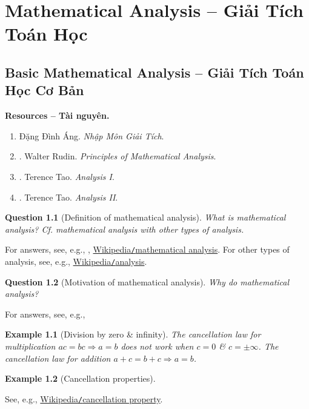 \documentclass[oneside]{book}
\newtheorem{example}{Example}
\newtheorem{question}{Question}
\begin{document}
\part{Mathematical Analysis -- Giải Tích Toán Học}

\chapter{Basic Mathematical Analysis -- Giải Tích Toán Học Cơ Bản}
\minitoc
\textbf{\textsf{Resources -- Tài nguyên.}}
\begin{enumerate}
	\item {\sc Đặng Đình Áng}. {\it Nhập Môn Giải Tích}.
	\item \cite{Rudin1976}. {\sc Walter Rudin}. {\it Principles of Mathematical Analysis}.
	
	\item \cite{Tao_analysis_1}. {\sc Terence Tao}. {\it Analysis I}.
	
	\item \cite{Tao_analysis_2}. {\sc Terence Tao}. {\it Analysis II}.
\end{enumerate}

\begin{question}[Definition of mathematical analysis]
	What is mathematical analysis? Cf. mathematical analysis with other types of analysis.
\end{question}
For answers, see, e.g., \cite[Chap. 1, Sect. 1.1: {\it What Is Analysis?}, pp. 1--2]{Tao_analysis_1}, \href{https://en.wikipedia.org/wiki/Mathematical_analysis}{Wikipedia{\tt/}mathematical analysis}. For other types of analysis, see, e.g., \href{https://en.wikipedia.org/wiki/Analysis}{Wikipedia{\tt/}analysis}.

\begin{question}[Motivation of mathematical analysis]
	Why do mathematical analysis?
\end{question}
For answers, see, e.g., \cite[Chap. 1, Sect. 1.2: {\it Why Do Analysis?}, pp. 2--10]{Tao_analysis_1}

\begin{example}[Division by zero \& infinity]
	The cancellation law for multiplication $ac = bc\Rightarrow a = b$ does not work when $c = 0$ \& $c = \pm\infty$. The cancellation law for addition $a + c = b + c\Rightarrow a = b$.
\end{example}

\begin{example}[Cancellation properties]
	
\end{example}
See, e.g., \href{https://en.wikipedia.org/wiki/Cancellation_property}{Wikipedia{\tt/}cancellation property}.
\end{document}
